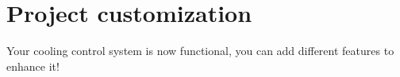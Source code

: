 \documentclass[11pt,a4paper]{article}
\theoremstyle{definition}%
\begin{document}



\section{Project customization}
Your cooling control system is now functional, you can add different features to enhance it!
\end{document}
